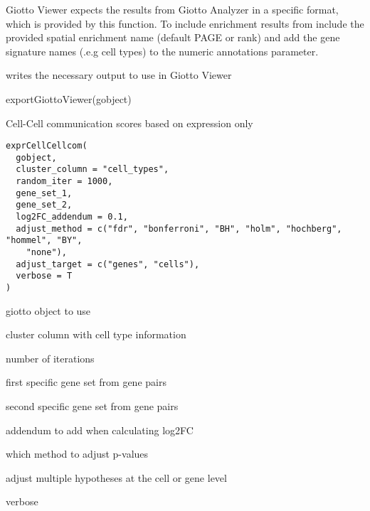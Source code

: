 \documentclass[a4paper]{book}
\begin{document}
%
\begin{Details}\relax
Giotto Viewer expects the results from Giotto Analyzer in a specific format,
which is provided by this function. To include enrichment results from 
include the provided spatial enrichment name (default PAGE or rank)
and add the gene signature names (.e.g cell types) to the numeric annotations parameter.
\end{Details}
%
\begin{Value}
writes the necessary output to use in Giotto Viewer
\end{Value}
%
\begin{Examples}
\begin{ExampleCode}
    exportGiottoViewer(gobject)
\end{ExampleCode}
\end{Examples}
%
\begin{Description}\relax
Cell-Cell communication scores based on expression only
\end{Description}
%
\begin{Usage}
\begin{verbatim}
exprCellCellcom(
  gobject,
  cluster_column = "cell_types",
  random_iter = 1000,
  gene_set_1,
  gene_set_2,
  log2FC_addendum = 0.1,
  adjust_method = c("fdr", "bonferroni", "BH", "holm", "hochberg", "hommel", "BY",
    "none"),
  adjust_target = c("genes", "cells"),
  verbose = T
)
\end{verbatim}
\end{Usage}
%
\begin{Arguments}
\begin{ldescription}
\item[\code{gobject}] giotto object to use

\item[\code{cluster\_column}] cluster column with cell type information

\item[\code{random\_iter}] number of iterations

\item[\code{gene\_set\_1}] first specific gene set from gene pairs

\item[\code{gene\_set\_2}] second specific gene set from gene pairs

\item[\code{log2FC\_addendum}] addendum to add when calculating log2FC

\item[\code{adjust\_method}] which method to adjust p-values

\item[\code{adjust\_target}] adjust multiple hypotheses at the cell or gene level

\item[\code{verbose}] verbose
\end{ldescription}
\end{Arguments}
\end{document}
